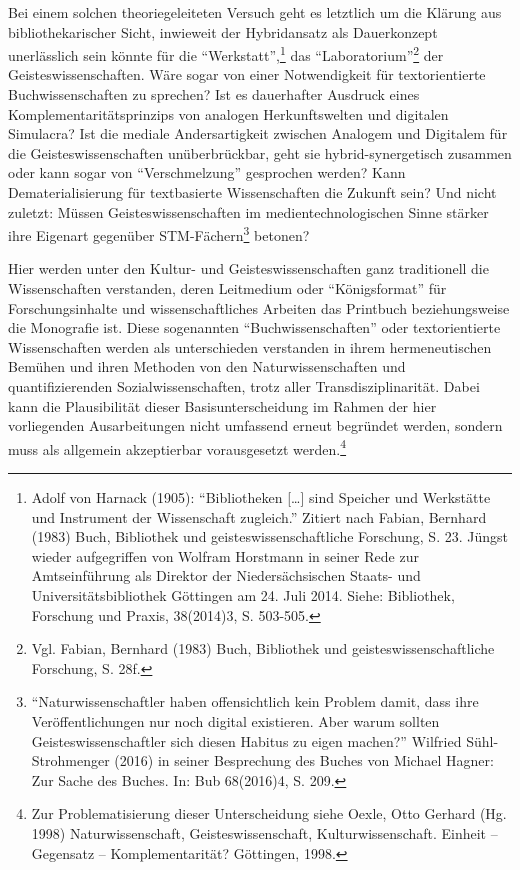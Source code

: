 \documentclass[a4paper,
fontsize=11pt,
oneside,
numbers=noperiodatend,
parskip=half-,
bibliography=totoc,
final
]{scrartcl}
\begin{document}
Bei einem solchen theoriegeleiteten Versuch geht es letztlich um die
Klärung aus bibliothekarischer Sicht, inwieweit der Hybridansatz als
Dauerkonzept unerlässlich sein könnte für die
\enquote{Werkstatt},\footnote{Adolf von Harnack (1905):
  \enquote{Bibliotheken {[}\ldots{}{]} sind Speicher und Werkstätte und
  Instrument der Wissenschaft zugleich.} Zitiert nach Fabian, Bernhard
  (1983) Buch, Bibliothek und geisteswissenschaftliche Forschung, S. 23.
  Jüngst wieder aufgegriffen von Wolfram Horstmann in seiner Rede zur
  Amtseinführung als Direktor der Niedersächsischen Staats- und
  Universitätsbibliothek Göttingen am 24. Juli 2014. Siehe: Bibliothek,
  Forschung und Praxis, 38(2014)3, S. 503-505.} das
\enquote{Laboratorium}\footnote{Vgl. Fabian, Bernhard (1983) Buch,
  Bibliothek und geisteswissenschaftliche Forschung, S. 28f.} der
Geisteswissenschaften. Wäre sogar von einer Notwendigkeit für
textorientierte Buchwissenschaften zu sprechen? Ist es dauerhafter
Ausdruck eines Komplementaritätsprinzips von analogen Herkunftswelten
und digitalen Simulacra? Ist die mediale Andersartigkeit zwischen
Analogem und Digitalem für die Geisteswissenschaften unüberbrückbar,
geht sie hybrid-synergetisch zusammen oder kann sogar von
\enquote{Verschmelzung} gesprochen werden? Kann Dematerialisierung für
textbasierte Wissenschaften die Zukunft sein? Und nicht zuletzt: Müssen
Geisteswissenschaften im medientechnologischen Sinne stärker ihre
Eigenart gegenüber STM-Fächern\footnote{\enquote{Naturwissenschaftler
  haben offensichtlich kein Problem damit, dass ihre Veröffentlichungen
  nur noch digital existieren. Aber warum sollten Geisteswissenschaftler
  sich diesen Habitus zu eigen machen?} Wilfried Sühl-Strohmenger (2016)
  in seiner Besprechung des Buches von Michael Hagner: Zur Sache des
  Buches. In: Bub 68(2016)4, S. 209.} betonen?

Hier werden unter den Kultur- und Geisteswissenschaften ganz
traditionell die Wissenschaften verstanden, deren Leitmedium oder
\enquote{Königsformat} für Forschungsinhalte und wissenschaftliches
Arbeiten das Printbuch beziehungsweise die Monografie ist. Diese
sogenannten \enquote{Buchwissenschaften} oder textorientierte
Wissenschaften werden als unterschieden verstanden in ihrem
hermeneutischen Bemühen und ihren Methoden von den Naturwissenschaften
und quantifizierenden Sozialwissenschaften, trotz aller
Transdisziplinarität. Dabei kann die Plausibilität dieser
Basisunterscheidung im Rahmen der hier vorliegenden Ausarbeitungen nicht
umfassend erneut begründet werden, sondern muss als allgemein
akzeptierbar vorausgesetzt werden.\footnote{Zur Problematisierung dieser
  Unterscheidung siehe Oexle, Otto Gerhard (Hg. 1998) Naturwissenschaft,
  Geisteswissenschaft, Kulturwissenschaft. Einheit -- Gegensatz --
  Komplementarität? Göttingen, 1998.}
\end{document}
